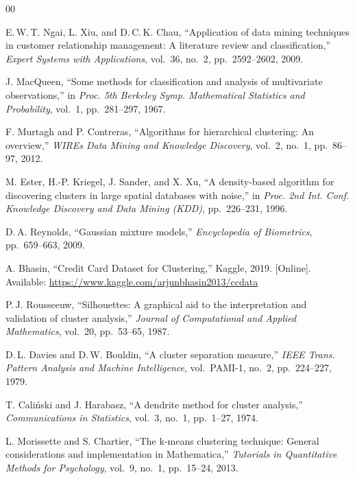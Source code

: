\documentclass[conference]{IEEEtran}
\begin{document}
\balance
\begin{thebibliography}{00}

E.\,W.\,T. Ngai, L. Xiu, and D.\,C.\,K. Chau,
``Application of data mining techniques in customer relationship
management: A literature review and classification,''
\textit{Expert Systems with Applications},
vol.~36, no.~2, pp.~2592--2602, 2009.

J. MacQueen,
``Some methods for classification and analysis of multivariate
observations,''
in \textit{Proc. 5th Berkeley Symp. Mathematical Statistics and
Probability}, vol.~1, pp.~281--297, 1967.

F. Murtagh and P. Contreras,
``Algorithms for hierarchical clustering: An overview,''
\textit{WIREs Data Mining and Knowledge Discovery},
vol.~2, no.~1, pp.~86--97, 2012.

M. Ester, H.-P. Kriegel, J. Sander, and X. Xu,
``A density-based algorithm for discovering clusters in large
spatial databases with noise,''
in \textit{Proc. 2nd Int. Conf. Knowledge Discovery and Data Mining
(KDD)}, pp.~226--231, 1996.

D.\,A. Reynolds,
``Gaussian mixture models,''
\textit{Encyclopedia of Biometrics}, pp.~659--663, 2009.

A. Bhasin,
``Credit Card Dataset for Clustering,''
Kaggle, 2019. [Online]. Available:
\url{https://www.kaggle.com/arjunbhasin2013/ccdata}

P.\,J. Rousseeuw,
``Silhouettes: A graphical aid to the interpretation and validation
of cluster analysis,''
\textit{Journal of Computational and Applied Mathematics},
vol.~20, pp.~53--65, 1987.

D.\,L. Davies and D.\,W. Bouldin,
``A cluster separation measure,''
\textit{IEEE Trans. Pattern Analysis and Machine Intelligence},
vol.~PAMI-1, no.~2, pp.~224--227, 1979.

T. Cali\'{n}ski and J. Harabasz,
``A dendrite method for cluster analysis,''
\textit{Communications in Statistics},
vol.~3, no.~1, pp.~1--27, 1974.

L. Morissette and S. Chartier,
``The k-means clustering technique: General considerations and
implementation in Mathematica,''
\textit{Tutorials in Quantitative Methods for Psychology},
vol.~9, no.~1, pp.~15--24, 2013.


\end{thebibliography}
\end{document}
